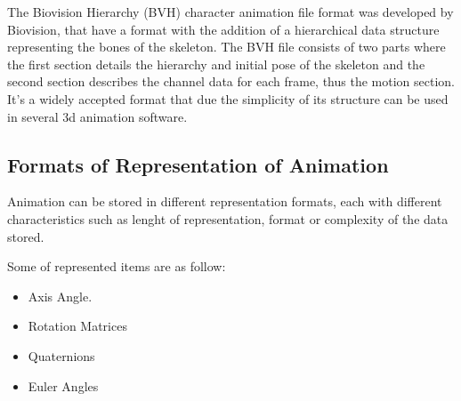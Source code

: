 The Biovision Hierarchy (BVH) character animation file format was developed by Biovision,   
that \citep{hayes2013acting} have a format with the addition of a hierarchical data structure 
representing the bones of the skeleton. The BVH file consists of two parts
where the first section details the hierarchy and initial pose of the skeleton and the second section
describes the channel data for each frame, thus the motion section.
It's a widely accepted format that due the simplicity of its structure can be used in several
3d animation software.

\subsection{Formats of Representation of Animation} \label{subsec:AnimationRepresentationFormats}

Animation can be stored in different representation formats, each with different characteristics such as lenght of representation,  format or complexity of the data stored.

Some of represented items are as follow:

\begin{itemize} 
	\item  Axis Angle.
	
	\item  Rotation Matrices
	
	\item  Quaternions
	
	\item  Euler Angles
	
\end{itemize}
